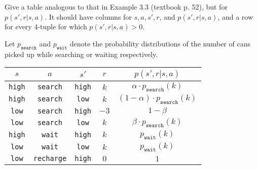 
\begin{exercise}[Exercise 3.4]

Give a table analogous to that in Example 3.3 (textbook p. 52), but for $p(s',r|s,a)$.
It should have columns for $s, a, s', r$, and $p(s',r|s,a)$, and a row for every 4-tuple
for which $p(s',r|s,a) > 0$.

\end{exercise}


\begin{solution}
Let $p_{\texttt{search}}$ and $p_{\texttt{wait}}$ denote the probability
distributions of the number of cans picked up while searching or waiting
respectively.
\begin{center}
\begin{tabular}{ ccc|c|c }
 $s$ & $a$ & $s'$ & $r$ & $p(s',r|s,a)$\\
 \hline
 \texttt{high} & \texttt{search} & \texttt{high} & $k$ & $\alpha \cdot p_{\texttt{search}}(k)$ \\
 \texttt{high} & \texttt{search} & \texttt{low} & $k$ & $(1 -\alpha) \cdot p_{\texttt{search}}(k)$ \\
 \texttt{low} & \texttt{search} & \texttt{high} & $-3$ & $1- \beta$ \\
 \texttt{low} & \texttt{search} & \texttt{low} & $k$ & $\beta \cdot p_{\texttt{search}}(k)$ \\
 \texttt{high} & \texttt{wait} & \texttt{high} & $k$ & $p_{\texttt{wait}}(k)$ \\
 \texttt{low} & \texttt{wait} & \texttt{low} & $k$ & $p_{\texttt{wait}}(k)$ \\
 \texttt{low} & \texttt{recharge} & \texttt{high} & $0$ & $1$ \\
\end{tabular}
\end{center}


\end{solution}

